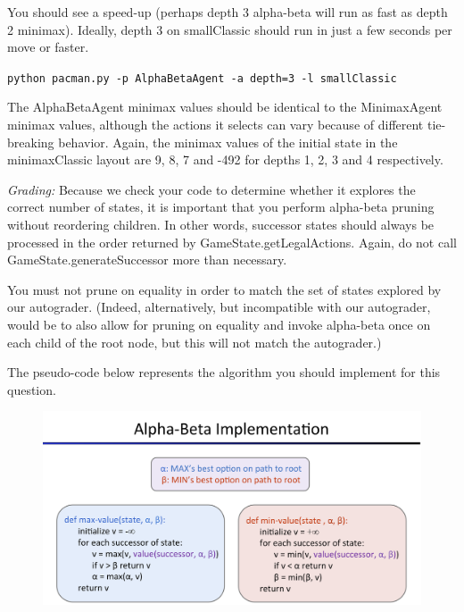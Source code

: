 \documentclass[a4paper, 11pt]{article}
\begin{document}
You should see a speed-up (perhaps depth 3 alpha-beta will run as fast as depth 2 minimax). Ideally, depth 3 on \textsf{smallClassic} should run in just a few seconds per move or faster.

\texttt{python pacman.py -p AlphaBetaAgent -a depth=3 -l smallClassic}

The \textsf{AlphaBetaAgent} minimax values should be identical to the \textsf{MinimaxAgent} minimax values, although the actions it selects can vary because of different tie-breaking behavior. Again, the minimax values of the initial state in the \textsf{minimaxClassic} layout are 9, 8, 7 and -492 for depths 1, 2, 3 and 4 respectively.

\textit{Grading:} Because we check your code to determine whether it explores the correct number of states, it is important that you perform alpha-beta pruning without reordering children. In other words, successor states should always be processed in the order returned by \textsf{GameState.getLegalActions}. Again, do not call \textsf{GameState.generateSuccessor} more than necessary.

You must not prune on equality in order to match the set of states explored by our autograder. (Indeed, alternatively, but incompatible with our autograder, would be to also allow for pruning on equality and invoke alpha-beta once on each child of the root node, but this will not match the autograder.)

The pseudo-code below represents the algorithm you should implement for this question.
\begin{figure}[h]
  \centering
  \includegraphics[width=15cm]{alpha-beta-on-inequality}
\end{figure}
\end{document}
